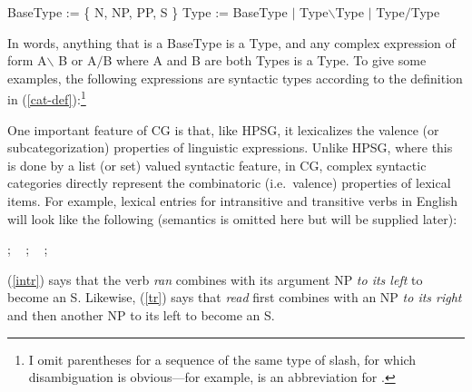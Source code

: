 \documentclass[output=paper]{langsci/langscibook}
\begin{document}
\begin{exe}
 \ex\label{cat-def}
  \begin{xlist}
 \ex\label{bascat}
    BaseType := \{ N,  NP, PP, S \}
 \ex\label{complex-cat}
    Type := BaseType $|$ Type\ensuremath{\backslash}Type $|$ Type\ensuremath{/}Type
  \end{xlist}
\end{exe}
In words, anything that is a BaseType is a Type, and
any complex expression of form A\ensuremath{\backslash} B  or A\ensuremath{/}B where A and B are both
Types is a Type. To give some examples, the following expressions are
syntactic types according to the definition in
(\ref{cat-def}):\footnote{I omit
parentheses for a sequence of the same type of slash, for which
disambiguation is obvious---for example,  is an abbreviation for .}

\begin{exe}
 \ex
  \begin{xlist}
 \ex
 \ex
 \ex
 \ex
  \end{xlist}
\end{exe}

One important feature of CG is that, like HPSG, it lexicalizes the
valence (or subcategorization) properties of linguistic expressions.
Unlike HPSG, where this is done by a list (or set) valued syntactic
feature, in CG, complex syntactic categories directly represent the
combinatoric (i.e.~valence) properties of lexical items. For example,
lexical entries for intransitive and transitive verbs in English will
look like the following (semantics is omitted here but will be
supplied later):

\begin{exe}
 \ex\label{lex1}
  \begin{xlist}
 \ex\label{intr}
    ; \  
 \ex\label{tr}
    ; \ 
 \ex\label{trthree}
    ; \ 
  \end{xlist}
\end{exe}
(\ref{intr}) says that the verb \textit{ran} combines with its argument NP \emph{to its
left} to become an S. Likewise, (\ref{tr}) says that \textit{read} first
combines with an NP \emph{to its right} and then another NP to its left to
become an S.
\end{document}
